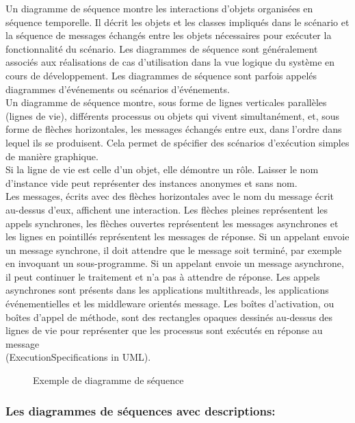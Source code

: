 \documentclass[12pt]{report}
\begin{document}
Un diagramme de séquence montre les interactions d'objets organisées en séquence temporelle. Il décrit les objets et les classes impliqués dans le scénario et la séquence de messages échangés entre les objets nécessaires pour exécuter la fonctionnalité du scénario. Les diagrammes de séquence sont généralement associés aux réalisations de cas d'utilisation dans la vue logique du système en cours de développement. Les diagrammes de séquence sont parfois appelés diagrammes d'événements ou scénarios d'événements.
\\
Un diagramme de séquence montre, sous forme de lignes verticales parallèles (lignes de vie), différents processus ou objets qui vivent simultanément, et, sous forme de flèches horizontales, les messages échangés entre eux, dans l'ordre dans lequel ils se produisent. Cela permet de spécifier des scénarios d'exécution simples de manière graphique.
\\
Si la ligne de vie est celle d'un objet, elle démontre un rôle. Laisser le nom d'instance vide peut représenter des instances anonymes et sans nom.
\\
Les messages, écrits avec des flèches horizontales avec le nom du message écrit au-dessus d'eux, affichent une interaction. Les flèches pleines représentent les appels synchrones, les flèches ouvertes représentent les messages asynchrones et les lignes en pointillés représentent les messages de réponse. Si un appelant envoie un message synchrone, il doit attendre que le message soit terminé, par exemple en invoquant un sous-programme. Si un appelant envoie un message asynchrone, il peut continuer le traitement et n’a pas à attendre de réponse. Les appels asynchrones sont présents dans les applications multithreads, les applications événementielles et les middleware orientés message. Les boîtes d'activation, ou boîtes d'appel de méthode, sont des rectangles opaques dessinés au-dessus des lignes de vie pour représenter que les processus sont exécutés en réponse au message\\ (ExecutionSpecifications in UML).

\vspace{0.2in}

\begin{figure}[h]
\centering
    \caption{Exemple de diagramme de séquence}
\end{figure}

\subsubsection{\large{Les diagrammes de séquences avec descriptions:}}
\end{document}
